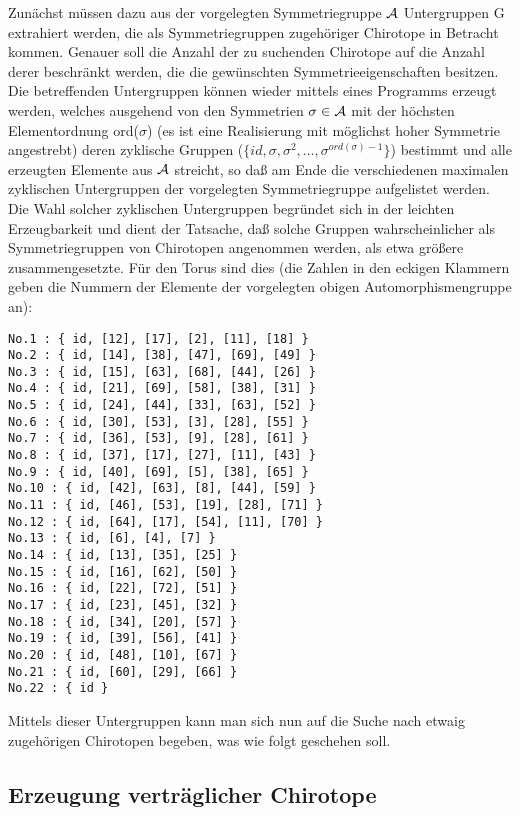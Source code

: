 Zunächst müssen dazu aus der vorgelegten Symmetriegruppe $\cal A$ Untergruppen
G extrahiert werden, die als Symmetriegruppen zugehöriger Chirotope in
Betracht kommen. Genauer soll die Anzahl der zu suchenden Chirotope auf
die Anzahl derer beschränkt werden, die die gewünschten Symmetrieeigenschaften
besitzen. Die betreffenden Untergruppen können wieder mittels eines Programms
erzeugt werden, welches ausgehend von den Symmetrien $\sigma\in {\cal A}$ mit
der höchsten Elementordnung ord($\sigma$) (es ist eine Realisierung mit
möglichst hoher Symmetrie angestrebt) deren zyklische Gruppen
($\{id,\sigma,\sigma^2,\ldots,\sigma^{ord(\sigma)-1}\}$) bestimmt und alle
erzeugten Elemente aus $\cal A$ streicht, so daß am Ende die verschiedenen
maximalen zyklischen Untergruppen der vorgelegten Symmetriegruppe aufgelistet
werden. Die Wahl solcher zyklischen Untergruppen begründet sich in der leichten
Erzeugbarkeit und dient der Tatsache, daß solche Gruppen wahrscheinlicher als
Symmetriegruppen von Chirotopen angenommen werden, als etwa größere
zusammengesetzte. Für den Torus sind dies (die Zahlen in den eckigen Klammern
geben die Nummern der Elemente der vorgelegten obigen Automorphismengruppe an):
\begin{verbatim}
No.1 : { id, [12], [17], [2], [11], [18] }
No.2 : { id, [14], [38], [47], [69], [49] }
No.3 : { id, [15], [63], [68], [44], [26] }
No.4 : { id, [21], [69], [58], [38], [31] }
No.5 : { id, [24], [44], [33], [63], [52] }
No.6 : { id, [30], [53], [3], [28], [55] }
No.7 : { id, [36], [53], [9], [28], [61] }
No.8 : { id, [37], [17], [27], [11], [43] }
No.9 : { id, [40], [69], [5], [38], [65] }
No.10 : { id, [42], [63], [8], [44], [59] }
No.11 : { id, [46], [53], [19], [28], [71] }
No.12 : { id, [64], [17], [54], [11], [70] }
No.13 : { id, [6], [4], [7] }
No.14 : { id, [13], [35], [25] }
No.15 : { id, [16], [62], [50] }
No.16 : { id, [22], [72], [51] }
No.17 : { id, [23], [45], [32] }
No.18 : { id, [34], [20], [57] }
No.19 : { id, [39], [56], [41] }
No.20 : { id, [48], [10], [67] }
No.21 : { id, [60], [29], [66] }
No.22 : { id }
\end{verbatim}

Mittels dieser Untergruppen kann man sich nun auf die Suche nach etwaig
zugehörigen Chirotopen begeben, was wie folgt geschehen soll.

\subsection{Erzeugung verträglicher Chirotope}

